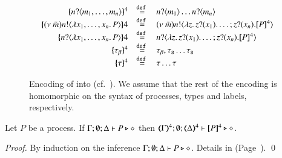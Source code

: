 \begin{figure}[t]
\[\begin{array}{rcl}
			\mapa{\bactinp{n}{m_1, \dots, m_n}}^{4} &\defeq& \bactinp{n}{m_1} \dots \bactinp{n}{m_n}
			\\
			\mapa{\news{\tilde{m}} \bactout{n}{\abs{x_1, \dots, x_n}{P}}}{4} &\defeq& \news{\tilde{m}} \bactout{n}{\abs{z}{\binp{z}{x_1} \dots; \binp{z}{x_n} \pmap{P}{4}}}
			\\
			\mapa{\bactinp{n}{\abs{x_1, \dots, x_n}{P}}}{4} &\defeq& \bactinp{n}{\abs{z}{\binp{z}{x_1} \dots; \binp{z}{x_n} \pmap{P}{4}}}
			\\
			\mapa{\btau}^{4} &\defeq& \btau, \stau \dots \stau
			\\
			\mapa{\tau}^{4} &\defeq& \tau \dots \tau
		\end{array}
	\]
%
	\caption{Encoding of \pHOp into \HOp (cf.~).
	We assume that the rest of the encoding is homomorphic on the syntax of
	processes, types and labels, respectively. \label{fig:enc:pHOp_to_HOp}}
\end{figure}

\begin{proposition}\rm
	\label{prop:typepres_pHOp_to_HOp}
	Let $P$ be a \pHOp process.
	If $\Gamma; \emptyset; \Delta \vdash P \triangleright \diamond$ then 
	$\tmap{\Gamma}{4}; \emptyset; \tmap{\Delta}{4} \proves \pmap{P}{4} \hastype \Proc$. 
\end{proposition}

\begin{proof}
	By induction on the inference $\Gamma; \emptyset; \Delta \vdash P \triangleright \diamond$.
	Details in  (Page~\pageref{app:prop:typepres_pHOp_to_HOp}).
	\qed
\end{proof}


